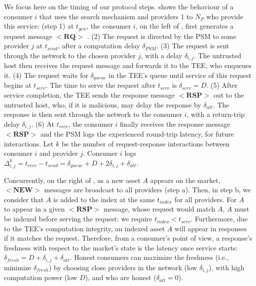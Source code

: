 We focus here on the timing of our protocol steps.
 shows the behaviour of a consumer $i$ that uses the search mechanism and providers 1 to $N_{P}$ who provide this service: 
(step 1) at $t_{gen}$, the consumer $i$, on the left of , first generates a request message $\mathbf{<RQ>}$ .
(2) The request is directed by the PSM to some provider $j$ at $t_{send}$, after a computation delay $\delta_{PSM}$. 
(3) The request is sent through the network to the chosen provider $j$, with a delay $\delta_{i,j}$. 
The untrusted host then receives the request message and forwards it to the TEE, who enqueues it.
(4) The request waits for $\delta_{queue}$ in the TEE's queue until service of this request begins at $t_{serv}$.
The time to serve the request after $t_{serv}$ is $\delta_{serv}=D$.
(5) After service completion, the TEE sends the response message $\mathbf{<RSP>}$ out to the untrusted host, who, if it is malicious, may delay the response by $\delta_{att}$. 
The response is then sent through the network to the consumer $i$, with a return-trip delay $\delta_{i,j}$.
(6) At $t_{recv}$, the consumer $i$ finally receives the response message $\mathbf{<RSP>}$ and the PSM logs the experienced round-trip latency, for future interactions. 
Let $k$ be the number of request-response interactions between consumer $i$ and provider $j$. 
Consumer $i$ logs $\Delta^{k}_{i,j}=t_{recv}-t_{send}=\delta_{queue}+D+2\delta_{i,j}+\delta_{att}$.

Concurrently, on the right of , as a new asset $A$ appears on the market, $\mathbf{<NEW>}$ messages are broadcast to all providers (step a). 
Then, in step b, we consider that $A$ is added to the index at the same $t_{index}$ for all providers.
For $A$ to appear in a given $\mathbf{<RSP>}$ message, whose request would match $A$, $A$ must be indexed before serving the request: we require $t_{index}<t_{serv}$.
Furthermore, due to the TEE's computation integrity, an indexed asset $A$ will appear in responses if it matches the request.
Therefore, from a consumer's point of view, a response's freshness with respect to the market's state is the latency once service starts: $\delta_{fresh}=D+\delta_{i,j}+\delta_{att}$.
Honest consumers can maximize the freshness (i.e., minimize $\delta_{fresh}$) by choosing close providers in the network (low $\delta_{i,j}$), with high computation power (low $D$), and who are honest ($\delta_{att}=0$).

